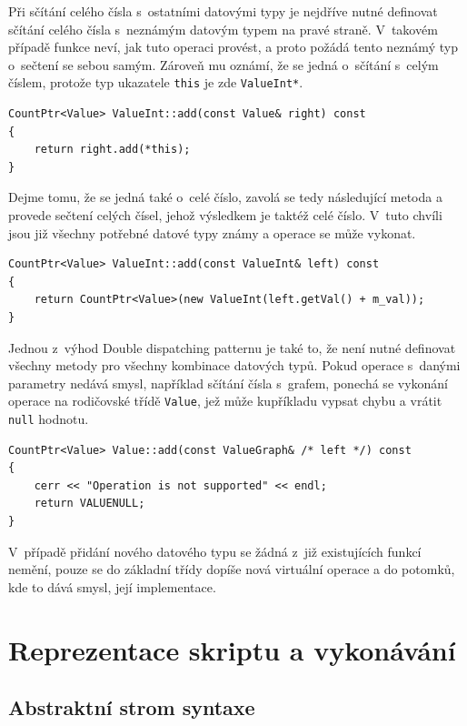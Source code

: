 \documentclass[11pt,twoside,a4paper]{book}
\begin{document}
Při sčítání celého čísla s~ostatními datovými typy je nejdříve nutné definovat sčítání celého čísla s~neznámým datovým typem na pravé straně. V~takovém případě funkce neví, jak tuto operaci provést, a proto požádá tento neznámý typ o~sečtení se sebou samým. Zároveň mu oznámí, že se jedná o~sčítání s~celým číslem, protože typ ukazatele \texttt{this} je zde \texttt{ValueInt*}.

\begin{verbatim}
CountPtr<Value> ValueInt::add(const Value& right) const
{
    return right.add(*this);
}
\end{verbatim}

Dejme tomu, že se jedná také o~celé číslo, zavolá se tedy následující metoda a provede sečtení celých čísel, jehož výsledkem je taktéž celé číslo. V~tuto chvíli jsou již všechny potřebné datové typy známy a operace se může vykonat.

\begin{verbatim}
CountPtr<Value> ValueInt::add(const ValueInt& left) const
{
    return CountPtr<Value>(new ValueInt(left.getVal() + m_val));
}
\end{verbatim}

Jednou z~výhod Double dispatching patternu je také to, že není nutné definovat všechny metody pro všechny kombinace datových typů. Pokud operace s~danými parametry nedává smysl, například sčítání čísla s~grafem, ponechá se vykonání operace na rodičovské třídě \texttt{Value}, jež může kupříkladu vypsat chybu a vrátit \texttt{null} hodnotu.

\begin{verbatim}
CountPtr<Value> Value::add(const ValueGraph& /* left */) const
{
    cerr << "Operation is not supported" << endl;
    return VALUENULL;
}
\end{verbatim}

V~případě přidání nového datového typu se žádná z~již existujících funkcí nemění, pouze se do základní třídy dopíše nová virtuální operace a do potomků, kde to dává smysl, její implementace.


\section{Reprezentace skriptu a vykonávání}

\subsection{Abstraktní strom syntaxe}
\label{abstraktni_strom_syntaxe}
\end{document}
